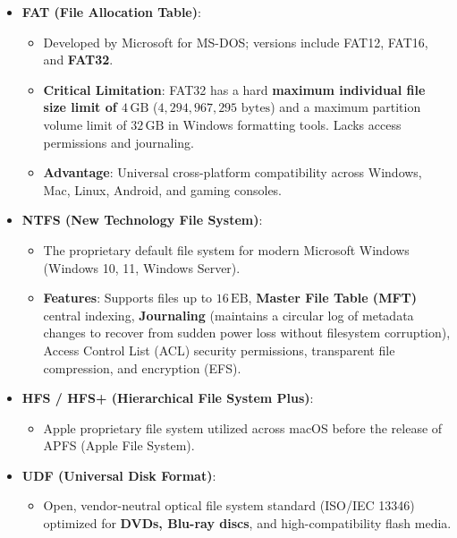 \begin{itemize}[leftmargin=1.5em]
    \item \textbf{FAT (File Allocation Table)}:
    \begin{itemize}
        \item Developed by Microsoft for MS-DOS; versions include FAT12, FAT16, and \textbf{FAT32}.
        \item \textbf{Critical Limitation}: FAT32 has a hard \textbf{maximum individual file size limit of $4\,\text{GB}$} ($4{,}294{,}967{,}295\text{ bytes}$) and a maximum partition volume limit of $32\,\text{GB}$ in Windows formatting tools. Lacks access permissions and journaling.
        \item \textbf{Advantage}: Universal cross-platform compatibility across Windows, Mac, Linux, Android, and gaming consoles.
    \end{itemize}

    \item \textbf{NTFS (New Technology File System)}:
    \begin{itemize}
        \item The proprietary default file system for modern Microsoft Windows (Windows 10, 11, Windows Server).
        \item \textbf{Features}: Supports files up to $16\,\text{EB}$, \textbf{Master File Table (MFT)} central indexing, \textbf{Journaling} (maintains a circular log of metadata changes to recover from sudden power loss without filesystem corruption), Access Control List (ACL) security permissions, transparent file compression, and encryption (EFS).
    \end{itemize}

    \item \textbf{HFS / HFS+ (Hierarchical File System Plus)}:
    \begin{itemize}
        \item Apple proprietary file system utilized across macOS before the release of APFS (Apple File System).
    \end{itemize}

    \item \textbf{UDF (Universal Disk Format)}:
    \begin{itemize}
        \item Open, vendor-neutral optical file system standard (ISO/IEC 13346) optimized for \textbf{DVDs, Blu-ray discs}, and high-compatibility flash media.
    \end{itemize}


\end{itemize}
